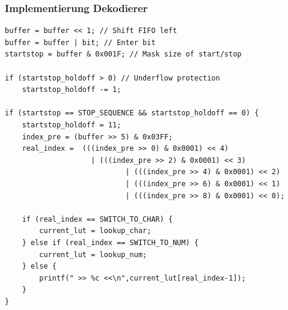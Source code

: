\documentclass{beamer}
\begin{document}


\begin{frame}[fragile]
	\frametitle{Implementierung Dekodierer}
	
	\begin{lstlisting}[basicstyle=\tiny,style=CStyle]			
buffer = buffer << 1; // Shift FIFO left
buffer = buffer | bit; // Enter bit
startstop = buffer & 0x001F; // Mask size of start/stop

if (startstop_holdoff > 0) // Underflow protection
	startstop_holdoff -= 1;

if (startstop == STOP_SEQUENCE && startstop_holdoff == 0) {
	startstop_holdoff = 11;
	index_pre = (buffer >> 5) & 0x03FF; 
	real_index =  (((index_pre >> 0) & 0x0001) << 4) 
		   		   	| (((index_pre >> 2) & 0x0001) << 3) 
							| (((index_pre >> 4) & 0x0001) << 2) 
							| (((index_pre >> 6) & 0x0001) << 1) 
							| (((index_pre >> 8) & 0x0001) << 0);

	if (real_index == SWITCH_TO_CHAR) {
		current_lut = lookup_char;
	} else if (real_index == SWITCH_TO_NUM) {
		current_lut = lookup_num;
	} else {
		printf(" >> %c <<\n",current_lut[real_index-1]); 
	}
}

\end{lstlisting}
\end{frame}
\end{document}
